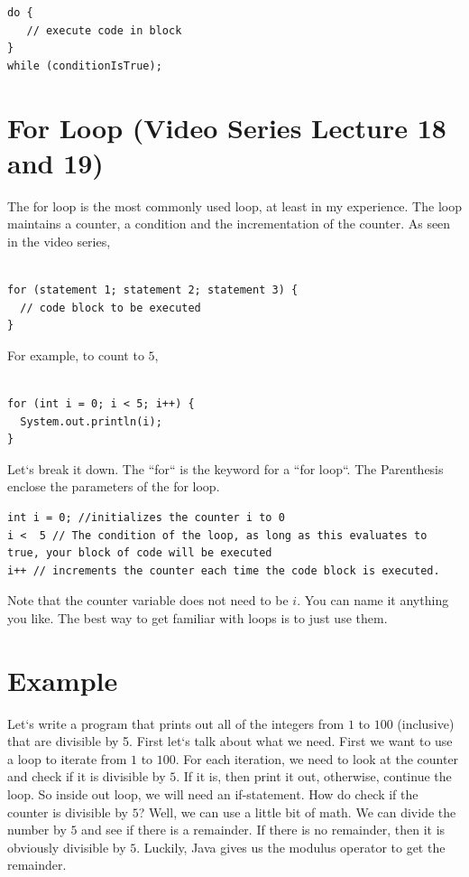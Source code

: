 \documentclass[11]{article}
\begin{document}
\begin{lstlisting}
do {
   // execute code in block
}
while (conditionIsTrue);
\end{lstlisting}
\section{For Loop (Video Series Lecture 18 and 19)}
The for loop is the most commonly used loop, at least in my experience. The loop maintains a counter, a condition and the incrementation of the counter. As seen in the video series, 
\begin{lstlisting}

for (statement 1; statement 2; statement 3) {
  // code block to be executed
}
\end{lstlisting}

For example, to count to $5$, 

\begin{lstlisting}

for (int i = 0; i < 5; i++) {
  System.out.println(i);
}
\end{lstlisting}

Let`s break it down. The ``for`` is the keyword for a ``for loop``. The Parenthesis enclose the parameters of the for loop.
\begin{lstlisting}
int i = 0; //initializes the counter i to 0
i <  5 // The condition of the loop, as long as this evaluates to true, your block of code will be executed
i++ // increments the counter each time the code block is executed.
\end{lstlisting}

Note that the counter variable does not need to be $i$. You can name it anything you like. The best way to get familiar with loops is to just use them.

\section{Example}
Let`s write a program that prints out all of the integers from $1$ to $100$ (inclusive) that are divisible by 5. First let`s talk about what we need. First we want to use a loop to iterate from $1$ to $100$. For each iteration, we need to look at the counter and check if it is divisible by $5$. If it is, then print it out, otherwise, continue the loop. So inside out loop, we will need an if-statement. How do check if the counter is divisible by $5$? Well, we can use a little bit of math. We can divide the number by $5$ and see if there is a remainder. If there is no remainder, then it is obviously divisible by $5$. Luckily, Java gives us the modulus operator to get the remainder. 
\end{document}
